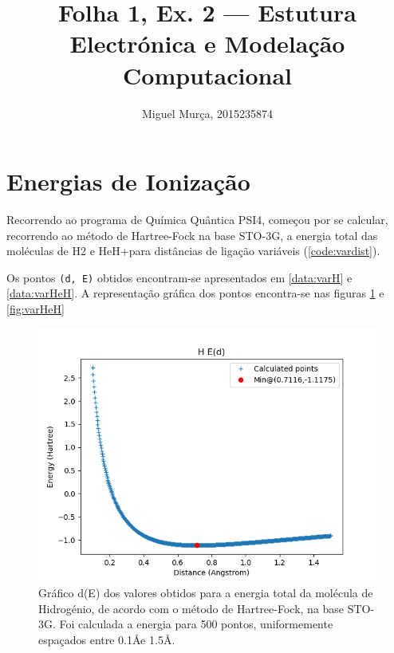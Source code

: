 \documentclass[portuguese,]{article}
\title{Folha 1, Ex. 2 --- Estutura Electrónica e Modelação Computacional}
\author{Miguel Murça, 2015235874}
\date{}
\begin{document}
\maketitle

\hypertarget{energias-de-ionizauxe7uxe3o}{%
\section{Energias de Ionização}\label{energias-de-ionizauxe7uxe3o}}

Recorrendo ao programa de Química Quântica PSI4, começou por se
calcular, recorrendo ao método de Hartree-Fock na base STO-3G, a energia
total das moléculas de H2 e HeH+para distâncias de ligação variáveis
(\ref{code:vardist}).

Os pontos \texttt{(d,\ E)} obtidos encontram-se apresentados em
\ref{data:varH} e \ref{data:varHeH}. A representação gráfica dos pontos
encontra-se nas figuras \ref{fig:varH} e \ref{fig:varHeH}

\begin{figure}
\centering
\includegraphics{bits/figures/ex2-H.png}
\caption{Gráfico d(E) dos valores obtidos para a energia total da
molécula de Hidrogénio, de acordo com o método de Hartree-Fock, na base
STO-3G. Foi calculada a energia para 500 pontos, uniformemente espaçados
entre 0.1\AA e 1.5\AA. \label{fig:varH}}
\end{figure}
\end{document}
